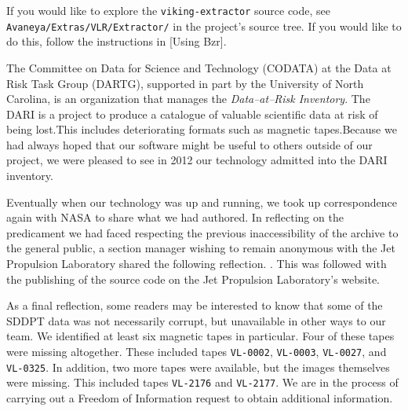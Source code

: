 If you would like to explore the {\tt viking-extractor} source code, see {\tt Avaneya/Extras/VLR/Extractor/} in the project's source tree. If you would like to do this, follow the instructions in [Using Bzr].

    {}


The Committee on Data for Science and Technology (CODATA) at the Data at Risk Task Group (DARTG), supported in part by the University of North Carolina, is an organization that manages the {\it Data--at--Risk Inventory}. The DARI is a project to produce a catalogue of valuable scientific data at risk of being lost.\footnotecite[murillo2012] This includes deteriorating formats such as magnetic tapes. Because we had always hoped that our software might be useful to others outside of our project, we were pleased to see in 2012 our technology admitted into the DARI inventory.

Eventually when our technology was up and running, we took up correspondence again with NASA to share what we had authored. In reflecting on the predicament we had faced respecting the previous inaccessibility of the archive to the general public, a section manager wishing to remain anonymous with the Jet Propulsion Laboratory shared the following reflection. . This was followed with the publishing of the source code on the Jet Propulsion Laboratory's website.

As a final reflection, some readers may be interested to know that some of the SDDPT data was not necessarily corrupt, but unavailable in other ways to our team. We identified at least six magnetic tapes in particular. Four of these tapes were missing altogether. These included tapes {\tt VL-0002}, {\tt VL-0003}, {\tt VL-0027}, and {\tt VL-0325}. In addition, two more tapes were available, but the images themselves were missing. This included tapes {\tt VL-2176} and {\tt VL-2177}. We are in the process of carrying out a Freedom of Information request to obtain additional information.

    {}

\StopChapter

